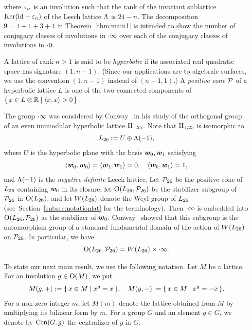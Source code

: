 \documentclass{amsart} %
\begin{document}
where $\varepsilon_n$ is an involution such that the rank of 
the invariant sublattice 
$\operatorname{Ker}(\mathord{\mathrm{id}}-\varepsilon_n)$ of the Leech lattice $\Lambda$ is $24-n$.
The decomposition $9=1+1+3+4$ in Theorem~\ref{thm:main1} 
is intended to show the number of conjugacy classes of involutions in $\cdot \infty$
over each of the conjugacy classes of involutions in $\cdot 0$.
\par
%
A lattice of rank 
$n>1$
 is said to be \emph{hyperbolic} if its associated real quadratic space has signature $(1,n-1)$.
 (Since our applications are to algebraic surfaces, we use the convention $(1,n-1)$ instead of $(n-1,1)$.)
A \emph{positive cone} $\mathord{\mathcal{P}}$ of a hyperbolic lattice $L$
is one of the two connected components 
of $\{\,{x\in L\otimes \mathord{\mathbb{R}}}\mid {\langle x, x \rangle > 0} \,\}$.
\par
The group $\cdot \infty$ was considered by Conway~\cite{MR690711}
 in his study of the orthogonal group of an even unimodular hyperbolic lattice $\mathrm{II}_{1,25}$.
Note that $\mathrm{II}_{1,25}$ is isomorphic to 
 \[
 L_{26}:= U\oplus \Lambda(-1), 
\]
where $U$ is the hyperbolic plane with the basis $\boldsymbol{w}_0, \boldsymbol{w}_1$
satisfying 
%
\begin{equation}\label{eq:w0w1}
\langle \boldsymbol{w}_0, \boldsymbol{w}_0 \rangle=\langle \boldsymbol{w}_1, \boldsymbol{w}_1 \rangle=0, 
\quad \langle \boldsymbol{w}_0, \boldsymbol{w}_1 \rangle=1, 
\end{equation}
%
and $\Lambda(-1)$ is the \emph{negative-definite} Leech lattice.
Let $\mathord{\mathcal{P}}_{26}$ be 
the positive cone of $L_{26}$ containing $\boldsymbol{w}_0$ in its closure, 
let $\mathord{\mathrm{O}}(L_{26}, \mathord{\mathcal{P}}_{26})$ be the stabilizer subgroup of $\mathord{\mathcal{P}}_{26}$ in $\mathord{\mathrm{O}}(L_{26})$, 
and 
let $W(L_{26})$ denote the Weyl group of $L_{26}$
(see~Section~\ref{subsec:notationlat} for the terminology).
Then $\cdot \infty$ is embedded into $\mathord{\mathrm{O}}(L_{26}, \mathord{\mathcal{P}}_{26})$
as the stabilizer of $\boldsymbol{w}_0$.
Conway~\cite{MR690711} showed that 
 this subgroup is
the automorphism group
of a standard fundamental domain of the action of $W(L_{26})$ on $\mathord{\mathcal{P}}_{26}$.
In particular, we have 
\[
\mathord{\mathrm{O}}(L_{26}, \mathord{\mathcal{P}}_{26})= W(L_{26}) \rtimes\cdot \infty.
\]
\par
%
To state our next main result, 
we use the following notation.
Let $M$ be a lattice.
For an involution $g\in \mathord{\mathrm{O}}(M)$, we put
%
\begin{equation}\label{eq:Mgpm}
M(g, +):=\{\,{x\in M}\mid {x^g=x} \,\},
\quad
M(g, -):=\{\,{x\in M}\mid {x^g=-x} \,\}.
\end{equation}
%
For a non-zero integer $m$,
let $M(m)$ denote the lattice obtained from $M$ by multiplying its bilinear form by
$m$.
For a group $G$ and an element $g\in G$,
we denote by $\mathrm{Cen}(G, g)$ the centralizer of $g$ in $G$.
\end{document}

